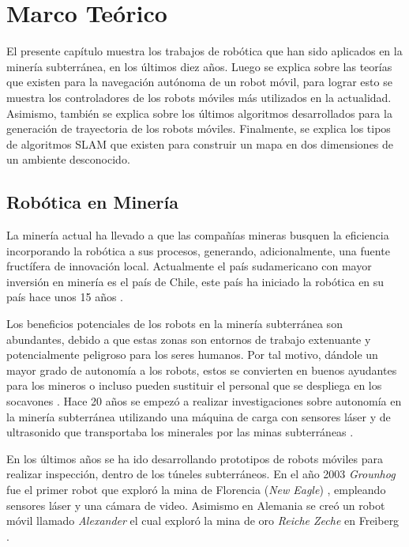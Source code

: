 \chapter{Marco Teórico}
El presente capítulo muestra los trabajos de robótica que han sido aplicados en 
la minería subterránea, en los últimos diez años. Luego se explica sobre las teorías
que existen para la navegación autónoma de un robot móvil, para lograr esto se muestra
los controladores de los robots móviles más utilizados en la actualidad. Asimismo, también
se explica sobre los últimos algoritmos desarrollados para la generación de trayectoria de 
los robots móviles. Finalmente, se explica los tipos de algoritmos SLAM que existen para 
construir un mapa en dos dimensiones de un ambiente desconocido.

\section{Rob\'otica en Miner\'ia}
La minería actual ha llevado a que las compañías mineras busquen la eficiencia 
incorporando la robótica a sus procesos, generando, adicionalmente, una fuente 
fructífera de innovación local. Actualmente el país sudamericano con mayor inversión 
en minería es el país de Chile, este país ha iniciado la robótica en su país hace 
unos 15 años \cite{Carmona2014}.

Los beneficios potenciales de los robots en la minería subterránea son abundantes, debido 
a que estas zonas son entornos de trabajo extenuante y potencialmente peligroso para 
los seres humanos. Por tal motivo, dándole un mayor grado de autonomía a los robots, estos 
se convierten en buenos ayudantes para los mineros o incluso pueden sustituir el personal 
que se despliega en los socavones \cite{Carmona2014}. Hace 20 años se empezó a realizar 
investigaciones sobre autonomía en la minería subterránea utilizando una máquina de carga 
con sensores láser y de ultrasonido que transportaba los minerales por las minas 
subterráneas \cite{Scheding1999}. 

En los últimos años se ha ido desarrollando prototipos de robots móviles para 
realizar inspección, dentro de los túneles subterráneos. En el año 2003 \textit{Grounhog}
fue el primer robot que exploró la mina de Florencia (\textit{New Eagle}) 
\cite{Thrun2004}, empleando sensores láser y una cámara de video. Asimismo en Alemania se 
creó un robot móvil llamado \textit{Alexander} el cual exploró la mina de oro 
\textit{Reiche Zeche} en Freiberg \cite{Grehl2015}.

